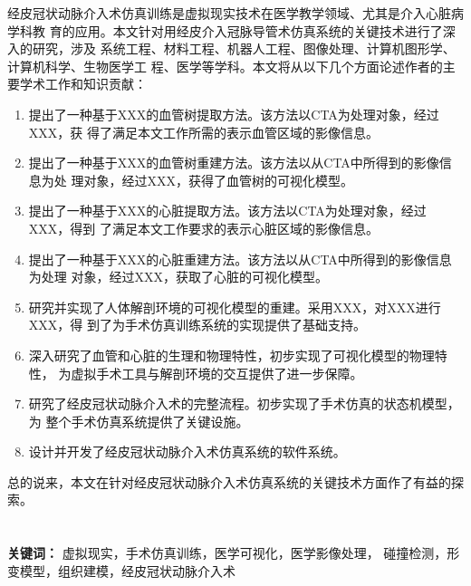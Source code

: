 经皮冠状动脉介入术仿真训练是虚拟现实技术在医学教学领域、尤其是介入心脏病学科教
育的应用。本文针对用经皮介入冠脉导管术仿真系统的关键技术进行了深入的研究，涉及
系统工程、材料工程、机器人工程、图像处理、计算机图形学、计算机科学、生物医学工
程、医学等学科。本文将从以下几个方面论述作者的主要学术工作和知识贡献：
\begin{enumerate}
    \item 提出了一种基于XXX的血管树提取方法。该方法以CTA为处理对象，经过XXX，获
    得了满足本文工作所需的表示血管区域的影像信息。
    \item 提出了一种基于XXX的血管树重建方法。该方法以从CTA中所得到的影像信息为处
    理对象，经过XXX，获得了血管树的可视化模型。
    \item 提出了一种基于XXX的心脏提取方法。该方法以CTA为处理对象，经过XXX，得到
    了满足本文工作要求的表示心脏区域的影像信息。
    \item 提出了一种基于XXX的心脏重建方法。该方法以从CTA中所得到的影像信息为处理
    对象，经过XXX，获取了心脏的可视化模型。
    \item 研究并实现了人体解剖环境的可视化模型的重建。采用XXX，对XXX进行XXX，得
    到了为手术仿真训练系统的实现提供了基础支持。
    \item 深入研究了血管和心脏的生理和物理特性，初步实现了可视化模型的物理特性，
    为虚拟手术工具与解剖环境的交互提供了进一步保障。
    \item 研究了经皮冠状动脉介入术的完整流程。初步实现了手术仿真的状态机模型，为
    整个手术仿真系统提供了关键设施。
    \item 设计并开发了经皮冠状动脉介入术仿真系统的软件系统。
\end{enumerate}
总的说来，本文在针对经皮冠状动脉介入术仿真系统的关键技术方面作了有益的探索。
\\
\\
\\
\noindent \textbf{关键词：} 虚拟现实，手术仿真训练，医学可视化，医学影像处理，
碰撞检测，形变模型，组织建模，经皮冠状动脉介入术
